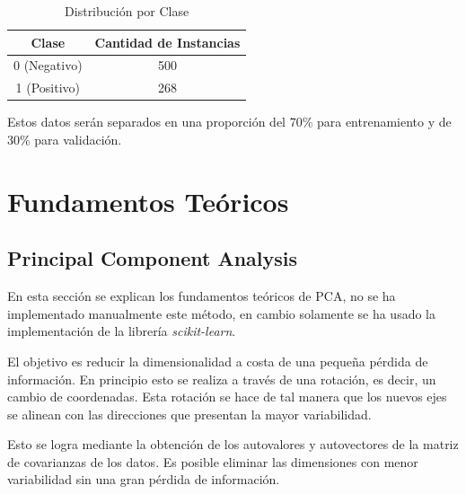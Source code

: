 \documentclass[letter, titlepage, 10pt]{article}
\begin{document}
\begin{table}[H]
\centering
\begin{tabular}{|c|c|}
\hline
\textbf{Clase} & \textbf{Cantidad de Instancias} \\ \hline
0 (Negativo)   & 500                             \\ \hline
1 (Positivo)   & 268                             \\ \hline
\end{tabular}
\caption{Distribución por Clase}
\end{table}

Estos datos serán separados en una proporción del 70\% para entrenamiento y de 30\% para validación. 


\newpage

\section{Fundamentos Teóricos}

\subsection{Principal Component Analysis}
En esta sección se explican los fundamentos teóricos de PCA, no se ha implementado manualmente este método, en cambio solamente se ha usado la implementación de la librería \textit{scikit-learn}.

El objetivo es reducir la dimensionalidad a costa de una pequeña pérdida de información. En principio esto se realiza a través de una rotación, es decir, un cambio de coordenadas. Esta rotación se hace de tal manera que los nuevos ejes se alinean con las direcciones que presentan la mayor variabilidad.

Esto se logra mediante la obtención de los autovalores y autovectores de la matriz de covarianzas de los datos. Es posible eliminar las dimensiones con menor variabilidad sin una gran pérdida de información.
\end{document}
